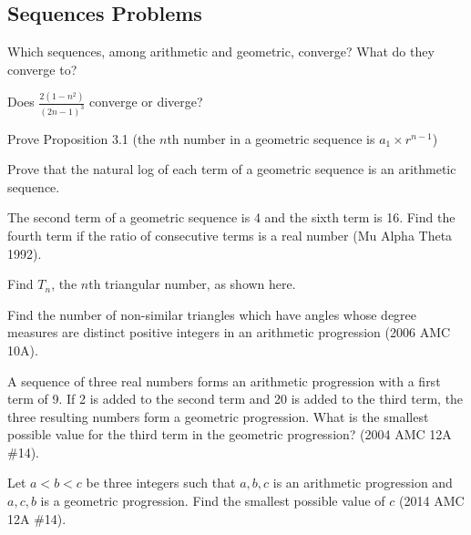 \documentclass[11pt]{article}
\newcommand{\important}{$\blacktriangleright\,$}
\newlength\radius
\newcommand\drawballs[2][]{%
	\foreach \y [evaluate=\y as \yy using #2+1-\y] in {1,...,#2} {%
		\foreach \x in {1,...,\yy} {%
			\shade[shading=ball,ball color=white,#1] 
				({(2*\x-2+\y)*\radius},{sqrt(3)*\y*\radius})
				circle (\radius); 
    		};
	}%
}
\begin{document}
\subsection*{Sequences Problems}
\begin{problem}[\important 00]
    Which sequences, among arithmetic and geometric, converge? What do they converge to?
\end{problem}
\begin{problem}[10]
    Does $\frac{2(1-n^2)}{(2n-1)^3}$ converge or diverge?
\end{problem}
\begin{problem}[\important 10]
    Prove Proposition 3.1 (the $n$th number in a geometric sequence is $a_1 \times r^{n-1}$)
\end{problem}
\begin{problem}[15]
    Prove that the natural log of each term of a geometric sequence is an arithmetic sequence.
\end{problem}
\begin{problem}[20]
    The second term of a geometric sequence is 4 and the sixth term is 16. Find the fourth term if the ratio of consecutive terms is a real number (Mu Alpha Theta 1992).
\end{problem}
\begin{problem}[15]
    Find $T_n$, the $n$th triangular number, as shown here.
    \begin{center}
\end{center}
\end{problem}
\begin{problem}[20]
    Find the number of non-similar triangles which have angles whose degree measures are distinct positive integers in an arithmetic progression (2006 AMC 10A).
\end{problem}
\begin{problem}[25]
    A sequence of three real numbers forms an arithmetic progression with a first term of 9. If 2 is added to the second term and 20 is added to the third term, the three resulting numbers form a geometric progression. What is the smallest possible value for the third term in the geometric progression? (2004 AMC 12A \#14).
\end{problem}
\begin{problem}[25]
    Let $a<b<c$ be three integers such that $a,b,c$ is an arithmetic progression and $a,c,b$ is a geometric progression. Find the smallest possible value of $c$ (2014 AMC 12A \#14).
\end{problem}
\end{document}

